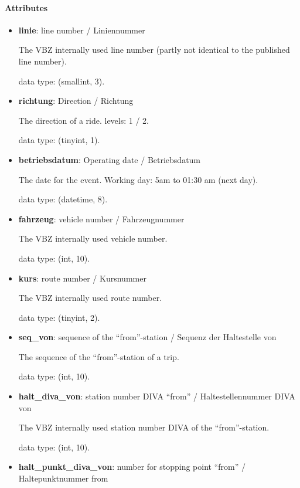 \documentclass[11pt]{article}
\begin{document}
\paragraph{Attributes}
\begin{itemize}

	\item \textbf{linie}: line number / Liniennummer
	
	The VBZ internally used line number (partly not identical to the published line number). 
	
	data type: (smallint, 3).
	
	\item \textbf{richtung}: Direction / Richtung
	
	The direction of a ride. levels: 1 / 2.
	
	data type: (tinyint, 1).
	
	\item \textbf{betriebsdatum}: Operating date / Betriebsdatum
	
	The date for the event. Working day: 5am to 01:30 am (next day).
	
	data type: (datetime, 8).
	
	\item \textbf{fahrzeug}: vehicle number / Fahrzeugnummer
	
	The VBZ internally used vehicle number.
	
	data type: (int, 10).
	
	\item \textbf{kurs}: route number / Kursnummer
	
	The VBZ internally used route number.
	
	data type: (tinyint, 2).
	
	\item \textbf{seq\_von}: sequence of the ``from''-station / Sequenz der Haltestelle von 
	
	The sequence of the ``from''-station of a trip.

	data type: (int, 10).
	
	\item \textbf{halt\_diva\_von}: station number DIVA ``from'' / Haltestellennummer DIVA von
	
	The VBZ internally used station number DIVA of the ``from''-station.
	
	data type: (int, 10).
	
	\item \textbf{halt\_punkt\_diva\_von}: number for stopping point ``from'' / Haltepunktnummer from
	

\end{itemize}
\end{document}

